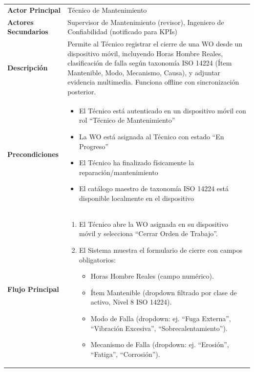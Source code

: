 \begin{longtable}{>{\raggedright\arraybackslash}p{0.21\textwidth} >{\raggedright\arraybackslash}p{0.74\textwidth}} \toprule
\textbf{Actor Principal} & Técnico de Mantenimiento \\
\textbf{Actores Secundarios} & Supervisor de Mantenimiento (revisor), Ingeniero de Confiabilidad (notificado para KPIs) \\
\textbf{Descripción} & Permite al Técnico registrar el cierre de una WO desde un dispositivo móvil, incluyendo Horas Hombre Reales, clasificación de falla según taxonomía ISO 14224 (Ítem Mantenible, Modo, Mecanismo, Causa), y adjuntar evidencia multimedia. Funciona offline con sincronización posterior. \\
\textbf{Precondiciones} & \parbox[t]{\linewidth}{\vspace{2pt} \begin{itemize}[leftmargin=1.5em, nosep, topsep=0pt]
\item El Técnico está autenticado en un dispositivo móvil con rol ``Técnico de Mantenimiento''
\item La WO está asignada al Técnico con estado ``En Progreso''
\item El Técnico ha finalizado físicamente la reparación/mantenimiento
\item El catálogo maestro de taxonomía ISO 14224 está disponible localmente en el dispositivo
\end{itemize} \vspace{2pt}} \\
\textbf{Flujo Principal} & \parbox[t]{\linewidth}{\vspace{2pt} \begin{enumerate}[leftmargin=1.5em, nosep, topsep=0pt]
\item El Técnico abre la WO asignada en su dispositivo móvil y selecciona ``Cerrar Orden de Trabajo''.
\item El Sistema muestra el formulario de cierre con campos obligatorios:
\begin{itemize}[leftmargin=1.2em, nosep, topsep=0pt]
\item Horas Hombre Reales (campo numérico).
\item Ítem Mantenible (dropdown filtrado por clase de activo, Nivel 8 ISO 14224).
\item Modo de Falla (dropdown: ej. ``Fuga Externa'', ``Vibración Excesiva'', ``Sobrecalentamiento'').
\item Mecanismo de Falla (dropdown: ej. ``Erosión'', ``Fatiga'', ``Corrosión'').

\end{itemize}
\end{enumerate}}
\end{longtable}
